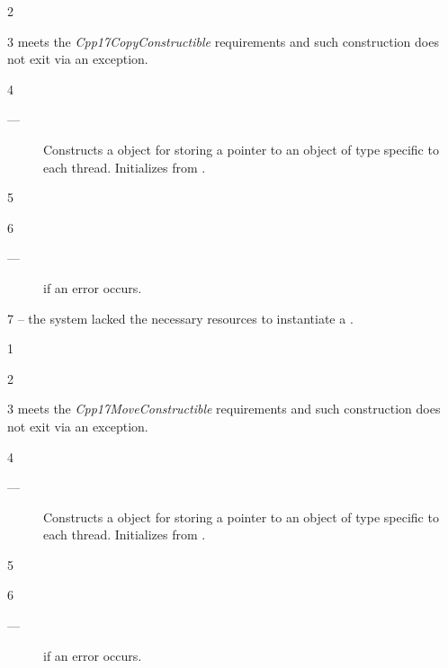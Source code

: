 \documentclass[fontsize=10pt,paper=A4,pagesize,DIV=15]{scrartcl}
\begin{document}
2 \mandates
{}

3 \precond
{} meets the \emph{Cpp17CopyConstructible} requirements and such
construction does not exit via an exception.

4 \effects
\begin{description}
    \item[---] Constructs a  object for storing a
               pointer to an object of type  specific to each thread.
               Initializes  from
               .
\end{description}

5 \postcond
{}

6 \except
\begin{description}
    \item[---]  if an error occurs.
\end{description}

7 \errors
{} -- the system lacked the necessary
resources to instantiate a \tptr.


1 \constraints
{}

2 \mandates
{}

3 \precond
{} meets the \emph{Cpp17MoveConstructible} requirements and such
construction does not exit via an exception.

4 \effects
\begin{description}
    \item[---] Constructs a  object for storing a
               pointer to an object of type  specific to each thread.
               Initializes  from
               .
\end{description}

5 \postcond
{}

6 \except
\begin{description}
    \item[---]  if an error occurs.
\end{description}
\end{document}
